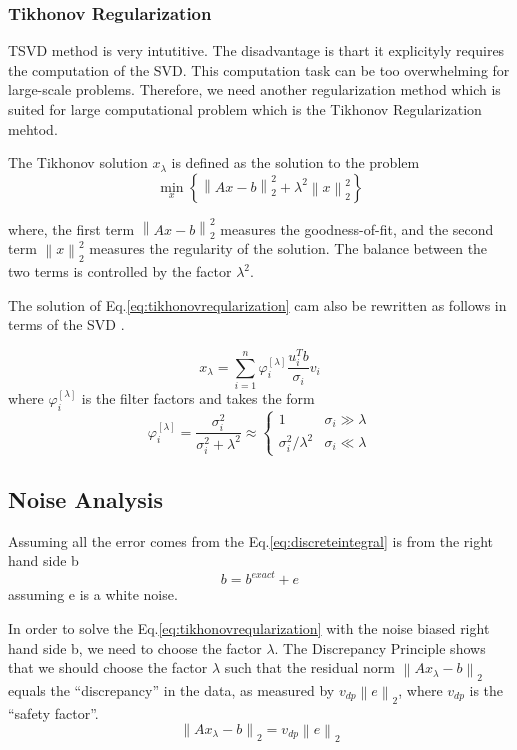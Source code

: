 \documentclass{article}
\begin{document}
\subsubsection{Tikhonov Regularization}
TSVD method is very intutitive. The disadvantage is thart it explicityly
requires the computation of the SVD. This computation task can be too
overwhelming for large-scale problems. Therefore, we need another regularization
method which is suited for large computational problem which is the Tikhonov
Regularization mehtod.

The Tikhonov solution \({x_\lambda }\) is defined as the solution to the problem
\begin{equation}
\mathop {\min }\limits_x \left\{ {\left\| {Ax - b} \right\|_2^2 + {\lambda
^2}\left\| x \right\|_2^2} \right\}
\label{eq:tikhonovreqularization}
\end{equation}

where, the first term \(\left\| {Ax - b} \right\|_2^2\) measures the
goodness-of-fit, and the second term \(\left\| x \right\|_2^2\) measures the
regularity of the solution. The balance between the two terms is controlled by
the factor \({\lambda ^2}\).

The solution of Eq.\ref{eq:tikhonovreqularization} cam also be rewritten as
follows in terms of the SVD \cite{hansen2010discrete}.

\begin{equation}
{x_\lambda } = \sum\limits_{i = 1}^n {\varphi _i^{[\lambda
]}\frac{{u_i^Tb}}{{{\sigma _i}}}{v_i}}
\end{equation}
where \(\varphi _i^{[\lambda ]}\) is the filter factors and takes the form
\[\varphi _i^{[\lambda ]} = \frac{{\sigma _i^2}}{{\sigma _i^2 + {\lambda ^2}}} \approx \left\{ {\begin{array}{*{20}{c}}
1&{{\sigma _i} \gg \lambda }\\
{\sigma _i^2/{\lambda ^2}}&{{\sigma _i} \ll \lambda }
\end{array}} \right.\]

\subsection{Noise Analysis}
Assuming all the error comes from the Eq.\ref{eq:discreteintegral} is from the
right hand side b
\[b = {b^{exact}} + e\]
assuming e is a white noise.

In order to solve the Eq.\ref{eq:tikhonovreqularization} with the noise biased
right hand side b, we need to choose the factor \(\lambda \). The Discrepancy
Principle \cite{hoekstra2010simulating} shows that we should choose the factor
\(\lambda \) such that the residual norm \({\left\| {A{x_\lambda } - b}
\right\|_2}\) equals the ``discrepancy'' in the data, as measured by
\({v_{dp}}{\left\| e \right\|_2}\), where \({v_{dp}}\) is the ``safety factor''.
\begin{equation}
{\left\| {A{x_\lambda } - b} \right\|_2} = {v_{dp}}{\left\| e \right\|_2}
\label{eq:discrepancy}
\end{equation}
\end{document}
